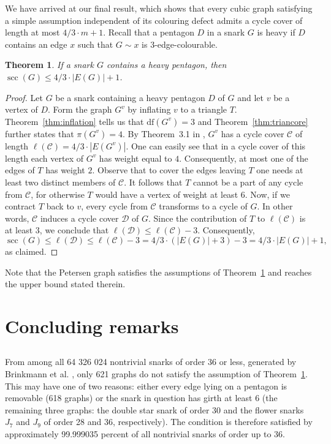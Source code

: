 \documentclass[a4paper]{amsart}
\newcommand{\df}[1]{\ensuremath{\mathrm{df}({#1})}\xspace}
\newcommand{\scc}{\operatorname{scc}\xspace}
\theoremstyle{plain}
\newtheorem{theorem}{Theorem}[section]
\theoremstyle{definition}
\begin{document}
We have arrived at our final result, which shows that every
cubic graph satisfying a simple assumption independent of its
colouring defect admits a cycle cover of length at most $4/3 \cdot m +1$.
Recall that a pentagon $D$ in a snark $G$ is heavy if $D$
contains an edge $x$ such that $G\sim x$ is
$3$-edge-colourable.

\begin{theorem}\label{thm:pentagons}
If a snark $G$ contains a heavy pentagon, then $\scc(G)\le
4/3\cdot|E(G)|+1$.
\end{theorem}

\begin{proof}
Let $G$ be a snark containing a heavy pentagon $D$ of $G$ and
let $v$ be a vertex of $D$. Form the graph $G^{v}$ by inflating
$v$ to a triangle $T$. Theorem~\ref{thm:inflation} tells us
that $\df{G^{v}}=3$ and Theorem~\ref{thm:triancore} further
states that $\pi(G^{v})=4$. By Theorem~3.1 in \cite{S2},
$G^{v}$ has a cycle cover $\mathcal{C}$ of length
$\ell(\mathcal{C})=4/3\cdot|E(G^{v})|$. One can easily see that
in a cycle cover of this length each vertex of $G^{v}$ has
weight equal to $4$.  Consequently, at most one of the edges of
$T$ has weight $2$. Observe that to cover the edges leaving $T$
one needs at least two distinct members of $\mathcal{C}$. It
follows that $T$ cannot be a part of any cycle from
$\mathcal{C}$, for otherwise $T$ would have a vertex of weight
at least $6$. Now, if we contract $T$ back to $v$, every cycle
from $\mathcal{C}$ transforms to a cycle of $G$. In other
words, $\mathcal{C}$ induces a cycle cover $\mathcal{D}$ of
$G$. Since the contribution of $T$ to $\ell(\mathcal{C})$ is at
least $3$, we conclude that
$\ell(\mathcal{D})\le\ell(\mathcal{C})-3$. Consequently,
$$\scc(G)\le\ell(\mathcal{D})\le\ell(\mathcal{C})-3=
4/3\cdot(|E(G)|+3)-3=4/3\cdot|E(G)|+1,$$
as claimed. \end{proof}

Note that the Petersen graph satisfies the assumptions of
Theorem~\ref{thm:pentagons} and reaches the upper bound stated
therein.

\section{Concluding remarks}\label{sec:remarks}

\subsection{}
From among all 64 326 024 nontrivial snarks of order 36 or
less, generated by Brinkmann et al. \cite{BGHM}, only 621
graphs do not satisfy the assumption of
Theorem~\ref{thm:pentagons}. This may have one of two reasons:
either every edge lying on a pentagon is removable (618 graphs)
or the snark in question has girth at least $6$ (the remaining
three graphs: the double star snark of order 30 and the flower
snarks $J_7$ and $J_9$ of order 28 and 36, respectively). The
condition is therefore satisfied by approximately 99.999035
percent of all nontrivial snarks of order up to 36.
\end{document}
